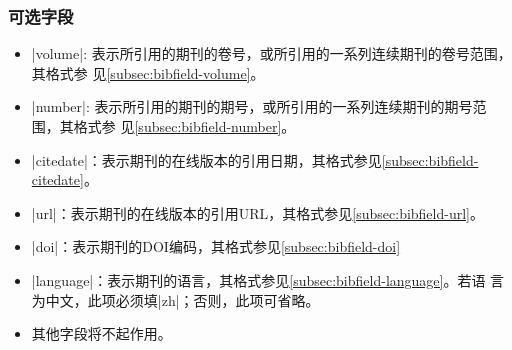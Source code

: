 \subsubsection{可选字段}

\begin{itemize}
\item |volume|: 表示所引用的期刊的卷号，或所引用的一系列连续期刊的卷号范围，其格式参
  见\ref{subsec:bibfield-volume}。
\item |number|: 表示所引用的期刊的期号，或所引用的一系列连续期刊的期号范围，其格式参
  见\ref{subsec:bibfield-number}。
\item |citedate|：表示期刊的在线版本的引用日期，其格式参见\ref{subsec:bibfield-citedate}。
\item |url|：表示期刊的在线版本的引用URL，其格式参见\ref{subsec:bibfield-url}。
\item |doi|：表示期刊的DOI编码，其格式参见\ref{subsec:bibfield-doi}
\item |language|：表示期刊的语言，其格式参见\ref{subsec:bibfield-language}。若语
  言为中文，此项必须填|zh|；否则，此项可省略。
\item 其他字段将不起作用。
\end{itemize}

